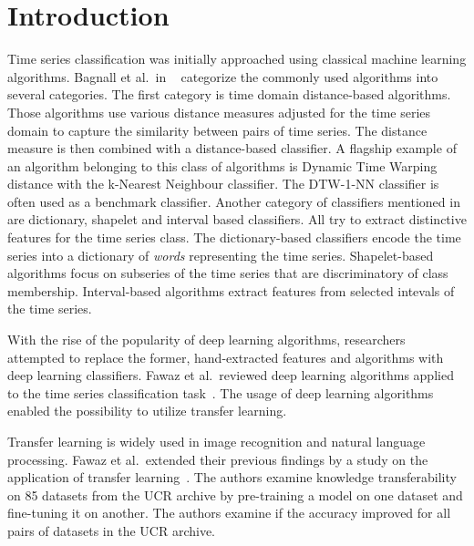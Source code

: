 \documentclass[a4paper,11pt,twoside]{report}
\theoremstyle{definition}
\begin{document}
\chapter{Introduction}
Time series classification was initially approached using classical machine learning algorithms. Bagnall et al.~in ~\cite{bake_off} categorize the commonly used algorithms into several categories. The first category is time domain distance-based algorithms. Those algorithms use various distance measures adjusted for the time series domain to capture the similarity between pairs of time series. The distance measure is then combined with a distance-based classifier. A flagship example of an algorithm belonging to this class of algorithms is Dynamic Time Warping distance with the k-Nearest Neighbour classifier. The DTW-1-NN classifier is often used as a benchmark classifier. Another category of classifiers mentioned in~\cite{bake_off} are dictionary, shapelet and interval based classifiers. All try to extract distinctive features for the time series class. The dictionary-based classifiers encode the time series into a dictionary of \textit{words} representing the time series. Shapelet-based algorithms focus on subseries of the time series that are discriminatory of class membership. Interval-based algorithms extract features from selected intevals of the time series.

With the rise of the popularity of deep learning algorithms, researchers attempted to replace the former, hand-extracted features and algorithms with deep learning classifiers. Fawaz et al.~reviewed deep learning algorithms applied to the time series classification task~\cite{dl_tsc}. The usage of deep learning algorithms enabled the possibility to utilize transfer learning.

Transfer learning is widely used in image recognition and natural language processing. Fawaz et al.~extended their previous findings by a study on the application of transfer learning~\cite{dl_tsc}. The authors examine knowledge transferability on 85 datasets from the UCR archive by pre-training a model on one dataset and fine-tuning it on another. The authors examine if the accuracy improved for all pairs of datasets in the UCR archive.
\end{document}
